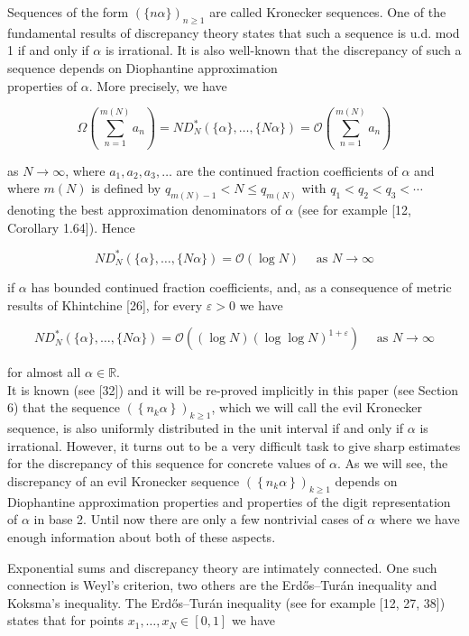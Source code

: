 \documentclass[10pt]{article}
\newcommand{\1}{\mathbf{1}}
\begin{document}
Sequences of the form $(\{n \alpha\})_{n \geqslant 1}$ are called Kronecker sequences. One of the fundamental results of discrepancy theory states that such a sequence is u.d. mod 1 if and only if $\alpha$ is irrational. It is also well-known that the discrepancy of such a sequence depends on Diophantine approximation\\
properties of $\alpha$. More precisely, we have

$$
\Omega\left(\sum_{n=1}^{m(N)} a_{n}\right)=N D_{N}^{*}(\{\alpha\}, \ldots,\{N \alpha\})=\mathcal{O}\left(\sum_{n=1}^{m(N)} a_{n}\right)
$$

as $N \rightarrow \infty$, where $a_{1}, a_{2}, a_{3}, \ldots$ are the continued fraction coefficients of $\alpha$ and where $m(N)$ is defined by $q_{m(N)-1}<N \leqslant q_{m(N)}$ with $q_1<q_2<q_3<\cdots$ denoting the best approximation denominators of $\alpha$ (see for example [12, Corollary 1.64]). Hence

$$
N D_{N}^{*}(\{\alpha\}, \ldots,\{N \alpha\})=\mathcal{O}(\log N) \quad \text { as } N \rightarrow \infty
$$

if $\alpha$ has bounded continued fraction coefficients, and, as a consequence of metric results of Khintchine [26], for every $\varepsilon>0$ we have

$$
N D_{N}^{*}(\{\alpha\}, \ldots,\{N \alpha\})=\mathcal{O}\left((\log N)(\log \log N)^{1+\varepsilon}\right) \quad \text { as } N \rightarrow \infty
$$

for almost all $\alpha \in \mathbb{R}$.\\[0pt]
It is known (see [32]) and it will be re-proved implicitly in this paper (see Section 6) that the sequence $\left(\left\{n_{k} \alpha\right\}\right)_{k \geqslant 1}$, which we will call the evil Kronecker sequence, is also uniformly distributed in the unit interval if and only if $\alpha$ is irrational. However, it turns out to be a very difficult task to give sharp estimates for the discrepancy of this sequence for concrete values of $\alpha$. As we will see, the discrepancy of an evil Kronecker sequence $\left(\left\{n_{k} \alpha\right\}\right)_{k \geqslant 1}$ depends on Diophantine approximation properties and properties of the digit representation of $\alpha$ in base 2. Until now there are only a few nontrivial cases of $\alpha$ where we have enough information about both of these aspects.

Exponential sums and discrepancy theory are intimately connected. One such connection is Weyl's criterion, two others are the Erdős--Turán inequality and Koksma's inequality. The Erdős--Turán inequality (see for example [12, 27, 38]) states that for points $x_{1}, \ldots, x_{N} \in[0,1]$ we have
\end{document}

